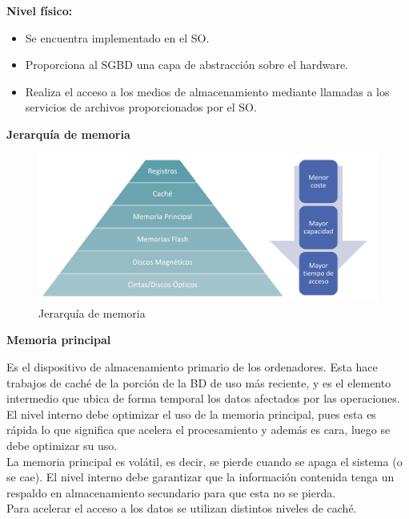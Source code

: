 \documentclass[a4paper,11pt]{article}
\begin{document}
\textbf{Nivel físico:}
\begin{itemize}
\item Se encuentra implementado en el SO.

\item Proporciona al SGBD una capa de abstracción sobre el hardware.

\item Realiza el acceso a los medios de almacenamiento mediante llamadas a los servicios de archivos proporcionados por el SO.
\end{itemize}

\textbf{Jerarquía de memoria}

\begin{figure}[h]
\centering
\caption{Jerarquía de memoria}
\includegraphics[scale=1,width=1\textwidth]{jerarquia_memoria.png}
\end{figure}

\textbf{Memoria principal}

Es el dispositivo de almacenamiento primario de los ordenadores. Esta hace trabajos de caché de la porción de la BD de uso más reciente, y es  el elemento intermedio que ubica de forma temporal los datos afectados por las operaciones. \\

El nivel interno debe optimizar el uso de la memoria principal, pues esta es rápida lo que significa que acelera el procesamiento y además es cara, luego se debe optimizar su uso. \\

La memoria principal es volátil, es decir, se pierde cuando se apaga el sistema (o se cae). El nivel interno debe garantizar que la información contenida tenga un respaldo en almacenamiento secundario para que esta no se pierda. \\

Para acelerar el acceso a los datos se utilizan distintos niveles de caché. \\
\end{document}
